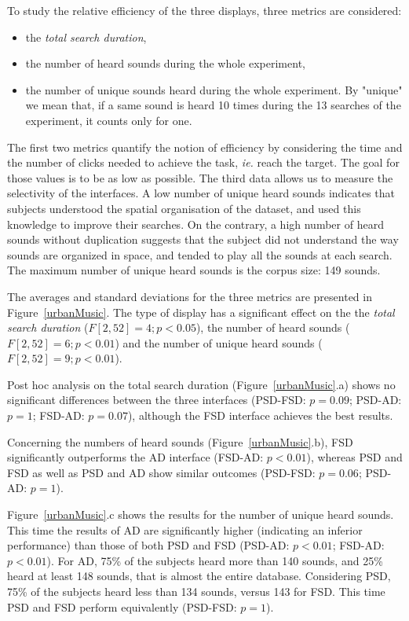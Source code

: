 \documentclass{aes2e}
\begin{document}
To study the relative efficiency of the three displays, three metrics are considered: 

\begin{itemize}
\item the \textit{total search duration},
\item the number of heard sounds during the whole experiment,
\item the number of unique sounds heard during the whole experiment. By "unique" we mean that, if a same sound is heard 10 times during the 13 searches of the  experiment, it counts only for one. 
\end{itemize}

The first two metrics quantify the notion of efficiency by considering the time and the number of clicks needed to achieve the task, \textit{ie.} reach the target. The goal for those values is to be as low as possible. The third data allows us to measure the selectivity of the interfaces. A low number of unique heard sounds indicates that subjects understood the spatial organisation of the dataset, and used this knowledge to improve their searches. On the contrary, a high number of heard sounds without duplication suggests that the subject did not understand the way sounds are organized in space, and tended to play all the sounds at each search. The maximum number of unique heard sounds is the corpus size: 149 sounds.

The averages and standard deviations for the three metrics are presented in Figure~\ref{urbanMusic}. The type of display has a significant effect on the the \textit{total search duration} ($F[2,52]=4; p<0.05$), the number of heard sounds ($F[2,52]=6; p<0.01$) and the number of unique heard sounds ($F[2,52]=9; p<0.01$). 

Post hoc analysis on the total search duration (Figure~\ref{urbanMusic}.a) shows no significant differences between the three interfaces (PSD-FSD: $p=0.09$; PSD-AD: $p=1$; FSD-AD: $p=0.07$), although the FSD interface achieves the best results.

Concerning the numbers of heard sounds (Figure~\ref{urbanMusic}.b), FSD significantly outperforms the AD interface (FSD-AD: $p<0.01$),  whereas PSD and FSD as well as PSD and AD show similar outcomes (PSD-FSD: $p=0.06$; PSD-AD: $p=1$).

Figure~\ref{urbanMusic}.c shows the results for the number of unique heard sounds. This time the results of AD are significantly higher (indicating an inferior performance) than those of both PSD and FSD (PSD-AD: $p<0.01$; FSD-AD: $p<0.01$).  For AD, 75\% of the subjects heard more than 140 sounds, and 25\% heard at least 148 sounds, that is almost the entire database. Considering PSD, 75\% of the subjects heard less than 134 sounds, versus 143 for FSD. This time PSD and FSD perform equivalently (PSD-FSD: $p=1$).
\end{document}
